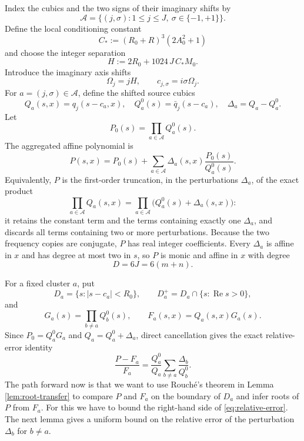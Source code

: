 \documentclass[final,5p,times,twocolumn]{elsarticle}
\newcommand{\Rea}{\operatorname{Re}}
\newcommand{\abs}[1]{\left|#1\right|}
\begin{document}
Index the cubics and the two signs of their imaginary shifts by
\[
\mathcal A=\{(j,\sigma):1\le j\le J,\ \sigma\in\{-1,+1\}\}.
\]
Define the local conditioning constant
\begin{equation}\label{eq:Cstar}
C_*:=(R_0+R)^3(2A_0^2+1)
\end{equation}
and choose the integer separation
\begin{equation}\label{eq:H}
\boxed{H:=2R_0+1024\,J\,C_*M_0.}
\end{equation}
Introduce the imaginary axis shifts
\[
\Omega_j=jH,\qquad c_{j,\sigma}=i\sigma\Omega_j.
\]
For $a=(j,\sigma)\in\mathcal A$, define the shifted source cubics
\begin{equation}\label{eq:shifted-factors}
Q_a(s,x)=q_j(s-c_a,x),\quad
Q_a^0(s)=\bar q_j(s-c_a),\quad
\Delta_a=Q_a-Q_a^0.
\end{equation}
Let
\[
P_0(s)=\prod_{a\in\mathcal A}Q_a^0(s).
\]
The aggregated affine polynomial is
\begin{equation}\label{eq:P-definition}
P(s,x)
=P_0(s)+\sum_{a\in\mathcal A}
\Delta_a(s,x)\frac{P_0(s)}{Q_a^0(s)}.
\end{equation}
Equivalently, $P$ is the first-order truncation, in the perturbations $\Delta_a$, of the exact product
\[
\prod_{a\in\mathcal A}Q_a(s,x)
=\prod_{a\in\mathcal A}\bigl(Q_a^0(s)+\Delta_a(s,x)\bigr):
\]
it retains the constant term and the terms containing exactly one $\Delta_a$, and discards all terms containing two or more perturbations. 
Because the two frequency copies are conjugate, $P$ has real integer coefficients. Every $\Delta_a$ is affine in $x$ and has degree at most two in $s$, so $P$ is monic and affine in $x$ with degree
\begin{equation}\label{eq:D}
D=6J=6(m+n).
\end{equation}

For a fixed cluster $a$, put
\begin{equation}\label{eq:cluster-disks}
D_a=\{s:\abs{s-c_a}<R_0\},
\qquad D_a^+=D_a\cap\{s:\Rea s>0\},
\end{equation}
and
\begin{equation}\label{eq:Fa}
G_a(s)=\prod_{b\ne a}Q_b^0(s),
\qquad F_a(s,x)=Q_a(s,x)G_a(s).
\end{equation}
Since $P_0=Q_a^0G_a$ and $Q_a=Q_a^0+\Delta_a$, direct cancellation gives the exact relative-error identity
\begin{equation}\label{eq:relative-error}
\frac{P-F_a}{F_a}
=\frac{Q_a^0}{Q_a}
\sum_{b\ne a}\frac{\Delta_b}{Q_b^0}.
\end{equation}
The path forward now is that we want to use Rouch\'e's theorem in Lemma \ref{lem:root-transfer} to compare $P$ and $F_a$ on the boundary of $D_a$ and infer roots of $P$ from $F_a$. For this we have to bound the right-hand side of \eqref{eq:relative-error}. 
The next lemma gives a uniform bound on the relative error of the perturbation $\Delta_b$ for $b\ne a$.
\end{document}
